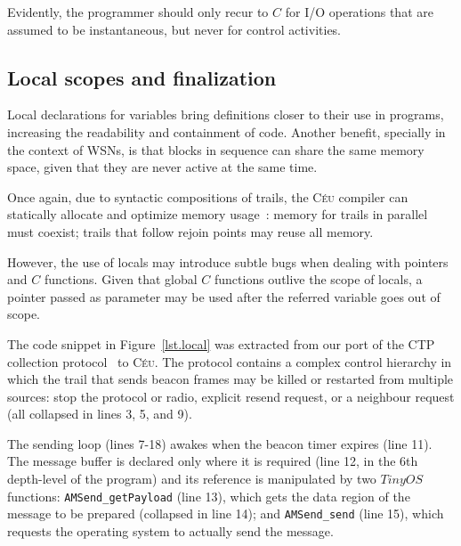 \documentclass[10pt]{sensys-proc}
\newcommand{\CEU}{\textsc{C\'{e}u}\xspace}
\newcommand{\code}[1] {{\small{\texttt{#1}}}}
\begin{document}
\begin{comment}
This approach is also adopted by Esterel, which supports the \code{call} 
primitive to execute code assumed to be instantaneous in the host 
language~\cite{esterel.primer}.
In \CEU, we take a step further and statically detects when such calls may 
execute concurrently, as discussed in the next section.
\end{comment}

Evidently, the programmer should only recur to $C$ for I/O operations that are 
assumed to be instantaneous, but never for control activities.

\subsection{Local scopes and finalization}
\label{sec.ceu.local}

Local declarations for variables bring definitions closer to their use in 
programs, increasing the readability and containment of code.
Another benefit, specially in the context of WSNs, is that blocks in sequence 
can share the same memory space, given that they are never active at the same 
time.

Once again, due to syntactic compositions of trails, the \CEU compiler can 
statically allocate and optimize memory usage~\cite{wsn.osm}:
memory for trails in parallel must coexist;
trails that follow rejoin points may reuse all memory.

However, the use of locals may introduce subtle bugs when dealing with pointers 
and $C$ functions.
Given that global $C$ functions outlive the scope of locals, a pointer passed 
as parameter may be used after the referred variable goes out of scope.

The code snippet in Figure~\ref{lst.local} was extracted from our port of the 
CTP collection protocol~\cite{wsn.teps} to \CEU.
The protocol contains a complex control hierarchy in which the trail that sends 
beacon frames may be killed or restarted from multiple sources: stop the 
protocol or radio, explicit resend request, or a neighbour request (all 
collapsed in lines 3, 5, and 9).

The sending loop (lines 7-18) awakes when the beacon timer expires (line 11).
The message buffer is declared only where it is required (line 12, in the 6th 
depth-level of the program) and its reference is manipulated by two $TinyOS$ 
functions:
\code{AMSend\_getPayload} (line 13), which gets the data region of the message 
to be prepared (collapsed in line 14);
and \code{AMSend\_send} (line 15), which requests the operating system to 
actually send the message.
\end{document}
